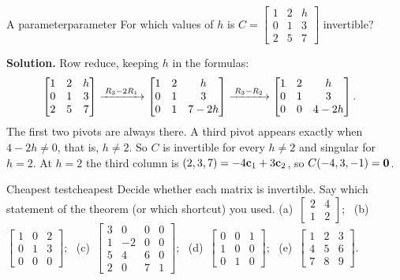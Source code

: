 \documentclass[11pt]{article}
\begin{document}
\begin{exmp}{A parameter}{parameter}
For which values of $h$ is $C=\begin{bmatrix}1&2&h\\0&1&3\\2&5&7\end{bmatrix}$ invertible?

\textbf{Solution.} Row reduce, keeping $h$ in the formulas:
\begin{align*}
\begin{bmatrix}1&2&h\\0&1&3\\2&5&7\end{bmatrix}
&\xrightarrow{\;R_3-2R_1\;}
\begin{bmatrix}1&2&h\\0&1&3\\0&1&7-2h\end{bmatrix}
\xrightarrow{\;R_3-R_2\;}
\begin{bmatrix}1&2&h\\0&1&3\\0&0&4-2h\end{bmatrix}.
\end{align*}
The first two pivots are always there. A third pivot appears exactly when $4-2h\neq0$, that is, $h\neq2$. So $C$ is invertible for every $h\neq2$ and singular for $h=2$. At $h=2$ the third column is $(2,3,7)=-4\mathbf{c}_1+3\mathbf{c}_2$, so $C(-4,3,-1)=\mathbf{0}$.
\end{exmp}

\begin{kc}{Cheapest test}{cheapest}
Decide whether each matrix is invertible. Say which statement of the theorem (or which shortcut) you used. (a)~$\begin{bmatrix}2&4\\1&2\end{bmatrix}$; \ (b)~$\begin{bmatrix}1&0&2\\0&1&3\\0&0&0\end{bmatrix}$; \ (c)~$\begin{bmatrix}3&0&0&0\\1&-2&0&0\\5&4&6&0\\2&0&7&1\end{bmatrix}$; \ (d)~$\begin{bmatrix}0&0&1\\1&0&0\\0&1&0\end{bmatrix}$; \ (e)~$\begin{bmatrix}1&2&3\\4&5&6\\7&8&9\end{bmatrix}$.
\end{kc}
\end{document}
